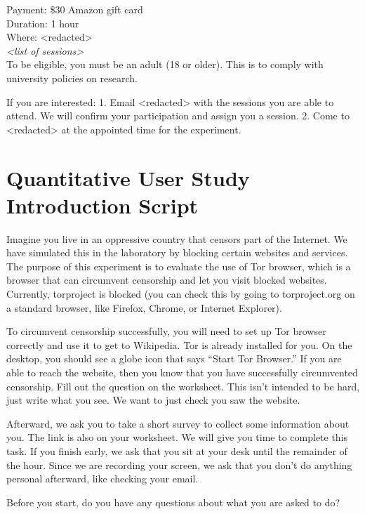 \documentclass[USenglish,oneside,twocolumn]{article}
\begin{document}
\indent Payment: \$30 Amazon gift card\\
\indent Duration: 1 hour \\
\indent Where: <redacted> \\ %

\textit{<list of sessions>}\\

To be eligible, you must be an adult (18 or older). This is to comply with university policies on research. 

If you are interested: 1. Email <redacted> %
with the sessions you are able to attend. We will confirm your participation and assign you a session. 
2. Come to <redacted> %
at the appointed time for the experiment.

\section{Quantitative User Study Introduction Script} 
\label{quantitative-script} 
Imagine you live in an oppressive country that censors part of the Internet. We have simulated this in the laboratory by blocking certain websites and services.  The purpose of this experiment is to evaluate the use of Tor browser, which is a browser that can circumvent censorship and let you visit blocked websites. Currently, torproject is blocked (you can check this by going to torproject.org on a standard browser, like Firefox, Chrome, or Internet Explorer). 

To circumvent censorship successfully, you will need to set up Tor browser correctly and use it to get to Wikipedia. Tor is already installed for you. On the desktop, you should see a globe icon that says ``Start Tor Browser.'' If you are able to reach the website, then you know that you have successfully circumvented censorship. Fill out the question on the worksheet. This isn't intended to be hard, just write what you see. We want to just check you saw the website. 

Afterward, we ask you to take a short survey to collect some information about you. The link is also on your worksheet.
We will give you time to complete this task. If you finish early, we ask that you sit at your desk until the remainder of the hour. Since we are recording your screen, we ask that you don't do anything personal afterward, like checking your email.

Before you start, do you have any questions about what you are asked to do? 
\end{document}
